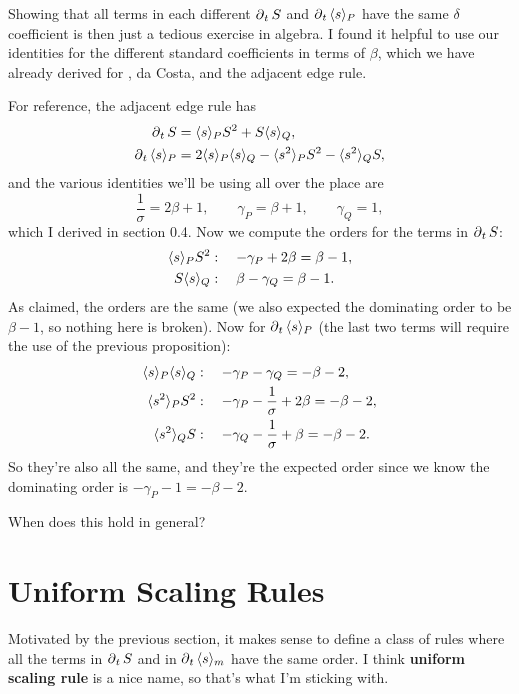\documentclass[twoside,10pt]{report}
\begin{document}
Showing that all terms in each different $\operatorname{\partial}_{t}{S} $ and $\operatorname{\partial}_{t}{\langle s \rangle_{P}} $ have the same $\delta$ coefficient is then just a tedious exercise in algebra. I found it helpful to use our identities for the different standard coefficients in terms of $\beta$, which we have already derived for \ER, da Costa, and the adjacent edge rule.

\begin{ex}
For reference, the adjacent edge rule has
\begin{align*}
	\operatorname{\partial}_{t}{S} &= \langle s \rangle_{P}S^2 + S\langle s \rangle_{Q}, \\
	\operatorname{\partial}_{t}{\langle s \rangle_{P}} &= 2\langle s \rangle_{P}\langle s \rangle_{Q} - \langle s^2 \rangle_{P}S^2 - \langle s^2 \rangle_{Q}S,
\end{align*}
and the various identities we'll be using all over the place are
\[
\frac{1}{\sigma} = 2\beta+1, \quad\quad \gamma_{P} = \beta+1, \quad\quad \gamma_{Q}=1,
\] which I derived in section 0.4. Now we compute the orders for the terms in $\operatorname{\partial}_{t}{S} $:
\begin{align*}
	\langle s \rangle_{P}S^2 &:\quad -\gamma_{P}+2\beta = \beta-1, \\
	S\langle s \rangle_{Q} &:\quad \beta-\gamma_{Q} = \beta-1.
\end{align*}
As claimed, the orders are the same (we also expected the dominating order to be $\beta-1$, so nothing here is broken). Now for $\operatorname{\partial}_{t}{\langle s \rangle_{P}} $ (the last two terms will require the use of the previous proposition):
\begin{align*}
	\langle s \rangle_{P}\langle s \rangle_{Q} &:\quad -\gamma_{P}-\gamma_{Q} = -\beta-2, \\
	\langle s^2 \rangle_{P}S^2 &:\quad -\gamma_{P} - \frac{1}{\sigma} + 2\beta = -\beta-2, \\
	\langle s^2 \rangle_{Q}S &:\quad -\gamma_{Q} - \frac{1}{\sigma} + \beta = -\beta-2.
\end{align*}
So they're also all the same, and they're the expected order since we know the dominating order is $-\gamma_{P}-1 = -\beta-2$.
\end{ex}
{\color{blue}When does this hold in general?}


\section{Uniform Scaling Rules}

Motivated by the previous section, it makes sense to define a class of rules where all the terms in $\operatorname{\partial}_{t}{S} $ and in $\operatorname{\partial}_{t}{\langle s \rangle_{m}} $ have the same order. I think \textbf{uniform scaling rule} is a nice name, so that's what I'm sticking with.
\end{document}
